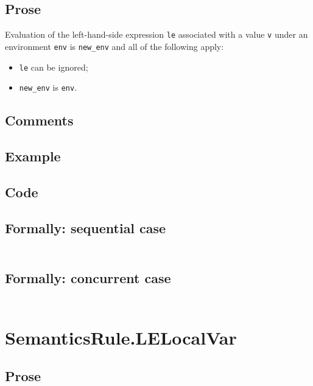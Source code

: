 \documentclass{book}
\begin{document}
    \subsection{Prose}
    Evaluation of the left-hand-side expression \texttt{le} associated with a
value \texttt{v} under an environment \texttt{env} is \texttt{new\_env} and all
of the following apply:
    \begin{itemize}
    \item \texttt{le} can be ignored;
    \item \texttt{new\_env} is \texttt{env}.
    \end{itemize}

  \subsection{Comments}

  \subsection{Example}

  \subsection{Code}

  \subsection{Formally: sequential case}
  \begin{align}
  \end{align} 

  \subsection{Formally: concurrent case}
  \begin{align}
  \end{align} 

\section{SemanticsRule.LELocalVar \label{sec:SemanticsRule.LELocalVar}}

    \subsection{Prose}
\end{document}
